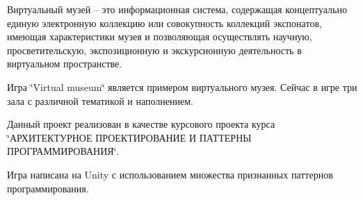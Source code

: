 Виртуальный музей – это информационная система, содержащая концептуально единую электронную коллекцию или совокупность коллекций экспонатов, имеющая характеристики музея и позволяющая осуществлять научную, просветительскую, экспозиционную и экскурсионную деятельность в виртуальном пространстве.

Игра \char`\"{}\+Virtual museum\char`\"{} является примером виртуального музея. Сейчас в игре три зала с различной тематикой и наполнением.

Данный проект реализован в качестве курсового проекта курса \char`\"{}АРХИТЕКТУРНОЕ ПРОЕКТИРОВАНИЕ И ПАТТЕРНЫ ПРОГРАММИРОВАНИЯ\char`\"{}.

Игра написана на Unity с использованием множества признанных паттернов программирования. 
